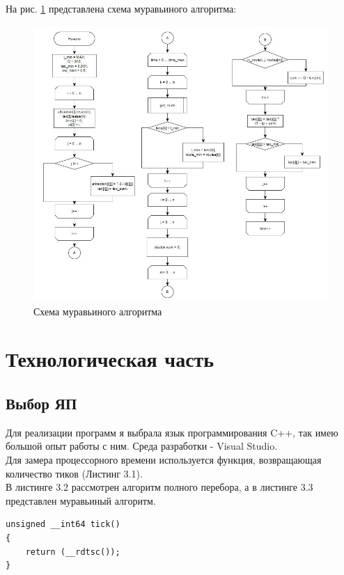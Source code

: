 \documentclass[12pt]{report}
\begin{document}
На рис. \ref{fig:def} представлена схема муравьиного алгоритма:
	\begin{figure}[h]
        	\begin{center}
        		\includegraphics[scale=0.8]{2}
        		\caption{Схема муравьиного алгоритма}
        		\label{fig:def}
        	\end{center}
        \end{figure}

\chapter{Технологическая часть}
\section{Выбор ЯП}
Для реализации программ я выбрала язык программирования C++, так имею большой опыт работы с ним. Среда разработки - Visual Studio. \\

Для замера процессорного времени используется функция, возвращающая количество тиков (Листинг 3.1).\\

В листинге 3.2 рассмотрен алгоритм полного перебора, а в листинге 3.3 представлен муравьиный алгоритм.\\

\begin{lstlisting}[label=some-code,caption=Функция получения тиков]
unsigned __int64 tick() 
{ 
	return (__rdtsc()); 
}

\end{lstlisting}
\end{document}
